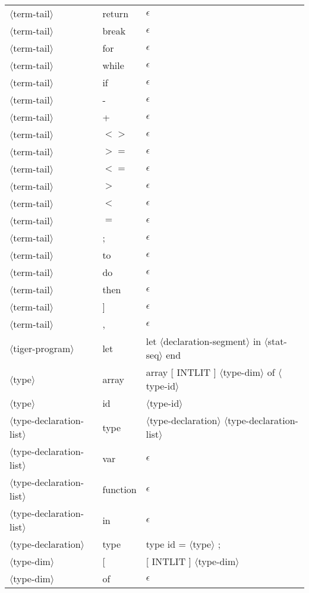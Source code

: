 \documentclass[11pt, fleqn]{article}
\newcommand{\atag}[1]{$\langle$#1$\rangle$}
\begin{document}
\begin{longtable}{l|l|l}
\atag{term-tail}					&	return	&	$\epsilon$		\\
\atag{term-tail}					&	break	&	$\epsilon$		\\
\atag{term-tail}					&	for		&	$\epsilon$		\\
\atag{term-tail}					&	while	&	$\epsilon$		\\
\atag{term-tail}					&	if		&	$\epsilon$		\\
\atag{term-tail}					&	-		&	$\epsilon$		\\
\atag{term-tail}					&	+		&	$\epsilon$		\\
\atag{term-tail}					&	$<>$		&	$\epsilon$		\\
\atag{term-tail}					&	$>=$		&	$\epsilon$		\\
\atag{term-tail}					&	$<=$		&	$\epsilon$		\\
\atag{term-tail}					&	$>$		&	$\epsilon$		\\
\atag{term-tail}					&	$<$		&	$\epsilon$		\\
\atag{term-tail}					&	$=$		&	$\epsilon$		\\
\atag{term-tail}					&	;		&	$\epsilon$		\\
\atag{term-tail}					&	to		&	$\epsilon$		\\
\atag{term-tail}					&	do		&	$\epsilon$		\\
\atag{term-tail}					&	then		&	$\epsilon$		\\
\atag{term-tail}					&	]		&	$\epsilon$		\\
\atag{term-tail}					&	,		&	$\epsilon$		\\
\atag{tiger-program}				&	let		&	let \atag{declaration-segment} in \atag{stat-seq} end	\\
\atag{type}						&	array		&	array [ INTLIT ] \atag{type-dim} of \atag{type-id}	\\
\atag{type}						&	id		&	\atag{type-id}	\\
\atag{type-declaration-list}		&	type		&	\atag{type-declaration} \atag{type-declaration-list}	\\
\atag{type-declaration-list}		&	var		&	$\epsilon$	\\
\atag{type-declaration-list}		&	function		&	$\epsilon$\\
\atag{type-declaration-list}		&	in		&	$\epsilon$\\
\atag{type-declaration}			&	type 	&	type id = \atag{type} ;		\\
\atag{type-dim}					&	[		&	[ INTLIT ] \atag{type-dim}	\\
\atag{type-dim}					&	of	&	$\epsilon$	\\

\end{longtable}
\end{document}

